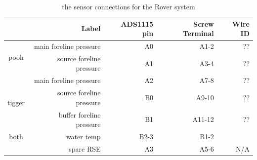 \documentclass{article}
\begin{document}
\begin{table}[]
\centering
\caption{the sensor connections for the Rover system}
\begin{tabular}{c|r|r|r|r}
& Label & ADS1115 pin & Screw Terminal & Wire ID \\ \hline
\multirow{2}{*}{pooh} & main foreline pressure & A0 & A1-2 & ?? \\ \cline{2-5}
& source foreline pressure & A1 & A3-4 & ?? \\ \hline \hline
\multirow{3}{*}{tigger} & main foreline pressure & A2 & A7-8 & ?? \\ \cline{2-5}
& source foreline pressure & B0 & A9-10 &  ?? \\ \cline{2-5}
& buffer foreline pressure & B1 & A11-12 & ?? \\ \hline \hline
both & water temp & B2-3 & B1-2 & \\ \cline{2-5}
& spare RSE & A3 & A5-6 & N/A
\end{tabular}
\label{tab:sense}
\end{table}
\end{document}
